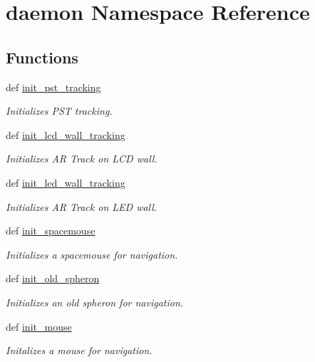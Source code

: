 \hypertarget{namespacedaemon}{\section{daemon \-Namespace \-Reference}
\label{namespacedaemon}
}
\subsection*{\-Functions}
\begin{DoxyCompactItemize}
\item 
def \hyperlink{namespacedaemon_a3370dcbbe709203e3a7b72f70c880980}{init\-\_\-pst\-\_\-tracking}
\begin{DoxyCompactList}\small\item\em \-Initializes \-P\-S\-T tracking. \end{DoxyCompactList}\item 
def \hyperlink{namespacedaemon_a2ae6b5b1fdd48d442b8dadab2b346175}{init\-\_\-lcd\-\_\-wall\-\_\-tracking}
\begin{DoxyCompactList}\small\item\em \-Initializes \-A\-R \-Track on \-L\-C\-D wall. \end{DoxyCompactList}\item 
def \hyperlink{namespacedaemon_a9aa6c44bf5e8a7eefb9bca7af0743984}{init\-\_\-led\-\_\-wall\-\_\-tracking}
\begin{DoxyCompactList}\small\item\em \-Initializes \-A\-R \-Track on \-L\-E\-D wall. \end{DoxyCompactList}\item 
def \hyperlink{namespacedaemon_a8b6a752d21ca1f98022ea684eed56894}{init\-\_\-spacemouse}
\begin{DoxyCompactList}\small\item\em \-Initializes a spacemouse for navigation. \end{DoxyCompactList}\item 
def \hyperlink{namespacedaemon_af32b4495a8a852852c3b312d2c222243}{init\-\_\-old\-\_\-spheron}
\begin{DoxyCompactList}\small\item\em \-Initializes an old spheron for navigation. \end{DoxyCompactList}\item 
def \hyperlink{namespacedaemon_af7b6ebf39a62f431f60b406433586d10}{init\-\_\-mouse}
\begin{DoxyCompactList}\small\item\em \-Initalizes a mouse for navigation. \end{DoxyCompactList}\item 

\end{DoxyCompactItemize}
